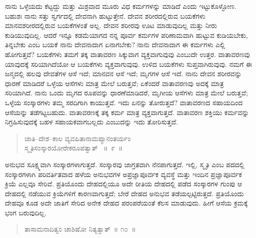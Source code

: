 ನಾನು ಒಳ್ಳೆಯದು ಕೆಟ್ಟದ್ದು ಮತ್ತು ಮಿಶ್ರವಾದ ಮೂರು ವಿಧ ಕರ್ಮಗಳನ್ನು ಮಾಡಿದೆ ಎಂದು ಇಟ್ಟುಕೊಳ್ಳೋಣ. ಬಹುಶಃ ನಾನು ಸತ್ತು ಸ್ವರ್ಗದಲ್ಲಿ ದೇವನಾಗಿ ಹುಟ್ಟುತ್ತೇನೆ. ದೇವನ ಶರೀರದಲ್ಲಿರುವ ಬಯಕೆಗಳು ಮಾನವಶರೀರದಲ್ಲಿರುವ ಬಯಕೆಗಳಂತೆ ಅಲ್ಲ. ದೇವನ ಶರೀರವು ಊಟ ಮಾಡುವುದಿಲ್ಲ ಮತ್ತು ನೀರು ಕುಡಿಯುವುದಿಲ್ಲ. ಆದರೆ ಇನ್ನೂ ಕಡಮೆಯಾಗದ ನನ್ನ ಪೂರ್ವ ಕರ್ಮಗಳ ಪರಿಣಾಮವಾಗಿ ಹುಟ್ಟುವ ಕುಡಿಯಬೇಕು, ತಿನ್ನಬೇಕು ಎಂಬ ಬಯಕೆ ನಾನು ದೇವನಾದಾಗ ಏನಾಗಬೇಕು? ನಾನು ದೇವನಾದಾಗ ಈ ಕರ್ಮಗಳು ಎಲ್ಲಿ ಹೋಗುತ್ತವೆ? ಬಯಕೆಗಳು ತಮಗೆ ತಕ್ಕ ವಾತಾವರಣ ಸಿಕ್ಕುವಾಗ ವ್ಯಕ್ತವಾಗುವುವು ಎಂಬುದೇ ಉತ್ತರ. ವಾತಾವರಣವು ಯಾವುದಕ್ಕೆ ಸರಿಯಾಗಿದೆಯೋ ಆ ಬಯಕೆಗಳು ವ್ಯಕ್ತವಾಗುವುವು. ಉಳಿದ ಬಯಕೆಗಳು ಸುಪ್ತವಾಗಿರುವುವು. ನಮಗೆ ಈ ಜನ್ಮದಲ್ಲಿ ಹಲವು ದೇವತೆಗಳ ಆಸೆ ಇದೆ; ಮಾನವನ ಆಸೆ ಇದೆ; ಮೃಗಗಳ ಆಸೆ ಇದೆ. ನಾನು ದೇವನ ಶರೀರವನ್ನು ಧಾರಣೆ ಮಾಡಿದರೆ ಒಳ್ಳೆಯ ಆಸೆಗಳು ಮಾತ್ರ ಮೇಲೆ ಬರುತ್ತವೆ; ಏಕೆಂದರೆ ವಾತಾವರಣವು ಅದಕ್ಕೆ ಮಾತ್ರ ಸರಿಯಾಗಿದೆ. ನಾನು ಒಂದು ಮೃಗದ ರೂಪವನ್ನು ಧಾರಣೆಮಾಡಿದರೆ, ಮೃಗೀಯ ಆಸೆಗಳು ಮಾತ್ರ ಮೇಲೆ ಬರುತ್ತವೆ; ಒಳ್ಳೆಯ ಸಂಸ್ಕಾರಗಳು ತಮ್ಮ ಸರದಿಗಾಗಿ ಕಾಯುತ್ತವೆ. ಇದು ಏನನ್ನು ತೋರುತ್ತದೆ? ವಾತಾವರಣದ ಸಹಾಯದಿಂದ ಆಸೆಯನ್ನು ತಡೆಗಟ್ಟಬಹುದು. ವಾತಾವರಣಕ್ಕೆ ತಕ್ಕ ಕರ್ಮ ಮಾತ್ರ ವ್ಯಕ್ತವಾಗುತ್ತದೆ. ವಾತಾವರಣ ಶಕ್ತಿಯು ಕರ್ಮವನ್ನು ನಿಗ್ರಹಿಸುವುದಕ್ಕೆ ಬಹಳ ಸಹಾಯಕವಾಗಬಲ್ಲದು ಎಂಬುದನ್ನು ಇದು ತೋರಿಸುತ್ತದೆ. 

\vspace{-0.2cm}

\begin{verse}
ಜಾತಿ–ದೇಶ–ಕಾಲ ವ್ಯವಹಿತಾನಾಮಪ್ಯಾನಂತರ್ಯಂ\\ ಸ್ಮೃತಿಸಂಸ್ಕಾರಯೋರೇಕರೂಪತ್ವಾತ್​~ \hfill{॥~೯~॥}
\end{verse}

\vspace{-0.35cm}


\vspace{0.1cm}

ಅನುಭವ ಸೂಕ್ಷ್ಮವಾಗಿ ಸಂಸ್ಕಾರಗಳಾಗುತ್ತದೆ. ಸಂಸ್ಕಾರವು ಜಾಗ್ರತವಾಗಿ ನೆನಪಾಗುತ್ತದೆ. ಇಲ್ಲಿ, ಸ್ಮೃತಿ ಎಂಬ ಪದದಲ್ಲಿ ಸಂಸ್ಕಾರಗಳಾಗಿ ಪರಿವರ್ತಿತವಾದ ಹಳೆಯ ಅನುಭವಗಳ ಅಪ್ರಜ್ಞಾಪೂರ್ವಕ ವ್ಯವಸ್ಥೆ ಮತ್ತು ಇಂದಿನ ಪ್ರಜ್ಞಾಪೂರ್ವಕ ಕ್ರಿಯೆ ಎಲ್ಲವೂ ಸೇರಿವೆ. ಪ್ರತಿಯೊಂದು ದೇಹದಲ್ಲಿಯೂ ಅದೇ ರೀತಿಯ ದೇಹದಲ್ಲಿ ಪಡೆದ ಸಂಸ್ಕಾರಗಳ ಗುಂಪು ಆ ದೇಹದಲ್ಲಿ ನಡೆಯುವ ಕ್ರಿಯೆಗಳಿಗೆ ಕಾರಣವಾಗುತ್ತದೆ; ಬೇರೆ ದೇಹದ ಅನುಭವ ತಡೆಯಲ್ಪಟ್ಟಿರುತ್ತದೆ. ಪ್ರತಿಯೊಂದು ದೇಹವೂ ಕೂಡ ಅದೇ ಜಾತಿಗೆ ಸೇರಿದ ಅನೇಕ ದೇಹದ ಪರಂಪರೆಯಂತೆ ಕೆಲಸ ಮಾಡುವುದು. ಹೀಗೆ ಆಸೆಯ ಕ್ರಮಕ್ಕೆ ಭಂಗ ಬರುವುದಿಲ್ಲ. 

\vspace{-0.2cm}

\begin{verse}
ತಾಸಾಮನಾದಿತ್ವಂ ಚಾಶಿಷೋ ನಿತ್ಯತ್ವಾತ್​~॥ ೧೦~॥
\end{verse}

\vspace{-0.35cm}

